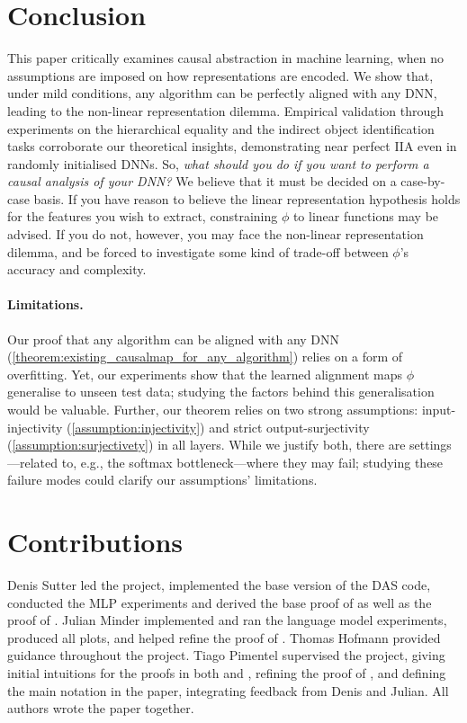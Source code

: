 \documentclass{article}
\newcommand{\causalmap}{\phi}
\begin{document}
\section{Conclusion}

This paper critically examines causal abstraction in machine learning, when no assumptions are imposed on how representations are encoded. We show that, under mild conditions, any algorithm can be perfectly aligned with any DNN, leading to the non-linear representation dilemma. 
Empirical validation through experiments on the hierarchical equality and the indirect object identification tasks corroborate our theoretical insights, demonstrating near perfect IIA even in randomly initialised DNNs.
So, \emph{what should you do if you want to perform a causal analysis of your DNN?}
We believe that it must be decided on a case-by-case basis. 
If you have reason to believe the linear representation hypothesis holds for the features you wish to extract, constraining $\causalmap$ to linear functions may be advised.
If you do not, however, you may face the non-linear representation dilemma, and be forced to investigate some kind of trade-off between $\causalmap$'s accuracy and complexity.

\paragraph{Limitations.}
Our proof that any algorithm can be aligned with any DNN (\cref{theorem:existing_causalmap_for_any_algorithm}) relies on a form of overfitting. 
Yet, our experiments show that the learned alignment maps $\causalmap$ generalise to unseen test data;
studying the factors behind this generalisation would be valuable. 
Further, our theorem relies on two strong assumptions: input-injectivity (\cref{assumption:injectivity}) and strict output-surjectivity (\cref{assumption:surjectivety}) in all layers. While we justify both, there are settings---related to, e.g., the softmax bottleneck---where they may fail; studying these failure modes could clarify our assumptions' limitations.

\section*{Contributions}

Denis Sutter led the project,
implemented the base version of the DAS code, conducted the MLP experiments and derived the base proof of  as well as the proof of .
Julian Minder implemented and ran the language model experiments, produced all plots, 
and helped refine the proof of . 
Thomas Hofmann provided guidance throughout the project. 
Tiago Pimentel supervised the project, giving initial intuitions for the proofs in both  and , refining the proof of , and defining the main notation in the paper, integrating feedback from Denis and Julian.
All authors wrote the paper together.
\end{document}
